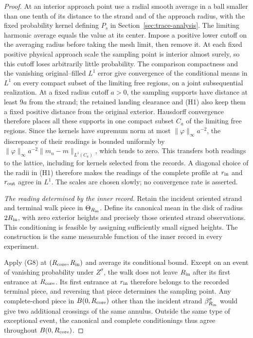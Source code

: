 \begin{proof}
At an interior approach point use a radial smooth average in a ball
smaller than one tenth of its distance to the strand and of the
approach radius, with the fixed probability kernel defining $P_s$ in
Section~\ref{sec:trace-analysis}. The limiting harmonic average equals
the value at its center. Impose a positive lower cutoff on the averaging radius
before taking the mesh limit, then remove it. At each fixed positive
physical approach scale the sampling point is interior almost surely,
so this cutoff loses arbitrarily little probability. The comparison
compactness and the vanishing original--filled $L^1$ error give
convergence of the conditional means in $L^1$ on every compact subset
of the limiting free regions, on a joint subsequential realization.
At a fixed radius cutoff $a>0$, the sampling supports have distance
at least $9a$ from the strand; the retained landing clearance and (H1)
also keep them a fixed positive distance from the original exterior.
Hausdorff convergence therefore places all these supports in one
compact subset $C_a$ of the limiting free regions. Since the kernels
have supremum norm at most $\|\varphi\|_\infty a^{-2}$, the discrepancy
of their readings is bounded uniformly by
$\|\varphi\|_\infty a^{-2}\|m_n-m\|_{L^1(C_a)}$, which tends to zero.
This transfers both readings to the lattice, including for kernels
selected from the records.
A diagonal choice of the radii in (H1) therefore makes the readings of
the complete profile at $r_{\rm in}$ and $r_{\rm out}$ agree in $L^1$.
The scales are chosen slowly; no convergence rate is asserted.

\emph{The reading determined by the inner record.}
Retain the incident oriented strand and terminal walk piece in
$\Theta_{R_{\rm in}}$. Define its canonical mean in the disk of radius
$2R_{\rm in}$, with zero exterior heights and precisely those oriented
strand observations. This conditioning is feasible by assigning
sufficiently small signed heights. The construction is the same
measurable function of the inner record in every experiment.

Apply (G8) at $(R_{\rm core},R_{\rm in})$ and average its conditional
bound. Except on an event of vanishing probability under $Z^\sigma$,
the walk does not leave $R_{\rm in}$ after its first entrance at
$R_{\rm core}$. Its first entrance at $r_{\rm in}$ therefore belongs
to the recorded terminal piece, and reversing that piece determines
the sampling point. Any complete-chord piece in $B(0,R_{\rm core})$
other than the incident strand $\beta_{R_{\rm in}}^\sigma$ would
give two additional crossings of the same annulus. Outside the same
type of exceptional event, the canonical and complete conditionings
thus agree throughout $B(0,R_{\rm core})$.


\end{proof}
